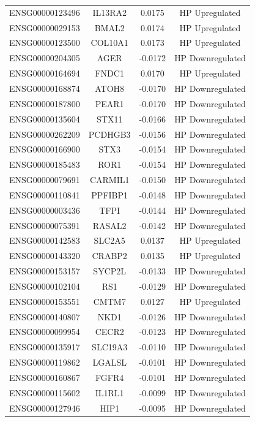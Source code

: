 \documentclass[
]{article}
\begin{document}
\begin{singlespace}
\begin{longtable}[t]{lccc}
ENSG00000123496 & IL13RA2 & 0.0175 & HP Upregulated\\
ENSG00000029153 & BMAL2 & 0.0174 & HP Upregulated\\
ENSG00000123500 & COL10A1 & 0.0173 & HP Upregulated\\
\addlinespace
ENSG00000204305 & AGER & -0.0172 & HP Downregulated\\
ENSG00000164694 & FNDC1 & 0.0170 & HP Upregulated\\
ENSG00000168874 & ATOH8 & -0.0170 & HP Downregulated\\
ENSG00000187800 & PEAR1 & -0.0170 & HP Downregulated\\
ENSG00000135604 & STX11 & -0.0166 & HP Downregulated\\
\addlinespace
ENSG00000262209 & PCDHGB3 & -0.0156 & HP Downregulated\\
ENSG00000166900 & STX3 & -0.0154 & HP Downregulated\\
ENSG00000185483 & ROR1 & -0.0154 & HP Downregulated\\
ENSG00000079691 & CARMIL1 & -0.0150 & HP Downregulated\\
ENSG00000110841 & PPFIBP1 & -0.0148 & HP Downregulated\\
\addlinespace
ENSG00000003436 & TFPI & -0.0144 & HP Downregulated\\
ENSG00000075391 & RASAL2 & -0.0142 & HP Downregulated\\
ENSG00000142583 & SLC2A5 & 0.0137 & HP Upregulated\\
ENSG00000143320 & CRABP2 & 0.0135 & HP Upregulated\\
ENSG00000153157 & SYCP2L & -0.0133 & HP Downregulated\\
\addlinespace
ENSG00000102104 & RS1 & -0.0129 & HP Downregulated\\
ENSG00000153551 & CMTM7 & 0.0127 & HP Upregulated\\
ENSG00000140807 & NKD1 & -0.0126 & HP Downregulated\\
ENSG00000099954 & CECR2 & -0.0123 & HP Downregulated\\
ENSG00000135917 & SLC19A3 & -0.0110 & HP Downregulated\\
\addlinespace
ENSG00000119862 & LGALSL & -0.0101 & HP Downregulated\\
ENSG00000160867 & FGFR4 & -0.0101 & HP Downregulated\\
ENSG00000115602 & IL1RL1 & -0.0099 & HP Downregulated\\
ENSG00000127946 & HIP1 & -0.0095 & HP Downregulated\\

\end{longtable}
\end{singlespace}
\end{document}
